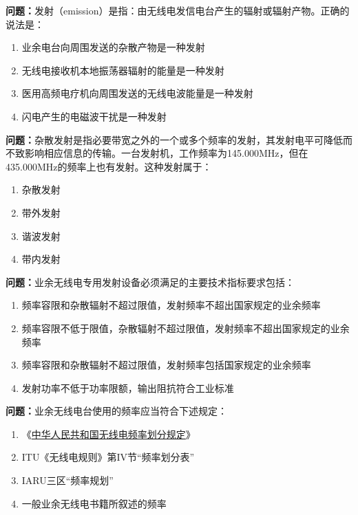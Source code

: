 \textbf{问题：}发射（emission）是指：由无线电发信电台产生的辐射或辐射产物。正确的说法是：
\begin{enumerate}[label=\Alph*), leftmargin=1.5cm]
	\item 业余电台向周围发送的杂散产物是一种发射
	\item 无线电接收机本地振荡器辐射的能量是一种发射
	\item 医用高频电疗机向周围发送的无线电波能量是一种发射
	\item 闪电产生的电磁波干扰是一种发射
\end{enumerate}

\textbf{问题：}杂散发射是指必要带宽之外的一个或多个频率的发射，其发射电平可降低而不致影响相应信息的传输。一台发射机，工作频率为145.000MHz，但在435.000MHz的频率上也有发射。这种发射属于：
\begin{enumerate}[label=\Alph*), leftmargin=1.5cm]
	\item 杂散发射
	\item 带外发射
	\item 谐波发射
	\item 带内发射
\end{enumerate}

\textbf{问题：}业余无线电专用发射设备必须满足的主要技术指标要求包括：
\begin{enumerate}[label=\Alph*), leftmargin=1.5cm]
	\item 频率容限和杂散辐射不超过限值，发射频率不超出国家规定的业余频率
	\item 频率容限不低于限值，杂散辐射不超过限值，发射频率不超出国家规定的业余频率
	\item 频率容限和杂散辐射不超过限值，发射频率包括国家规定的业余频率
	\item 发射功率不低于功率限额，输出阻抗符合工业标准
\end{enumerate}

\textbf{问题：}业余无线电台使用的频率应当符合下述规定：
\begin{enumerate}[label=\Alph*), leftmargin=1.5cm]
	\item 《\href{https://www.miit.gov.cn/zwgk/zcwj/wjfb/txy/art/2020/art_066386284cd2449493586c81ccafed11.html}{中华人民共和国无线电频率划分规定}》
	\item ITU《无线电规则》第IV节“频率划分表”
	\item IARU三区“频率规划”
	\item 一般业余无线电书籍所叙述的频率
\end{enumerate}

